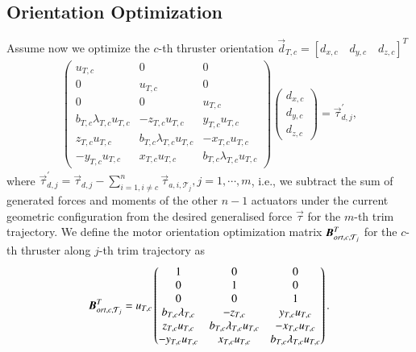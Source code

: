 \subsection{Orientation Optimization}
Assume now we optimize the $c$-th thruster orientation $\vec{d}_{T,c}=[d_{x,c} \quad d_{y,c} \quad d_{z,c}]^{T}$
\begin{align}
\begin{pmatrix}
u_{T,c}&0&0\\
0&u_{T,c}&0\\
0&0&u_{T,c}\\
b_{T,c}\lambda_{T,c}u_{T,c}&-z_{T,c}u_{T,c}&y_{T,c}u_{T,c}\\
z_{T,c}u_{T,c}&b_{T,c}\lambda_{T,c}u_{T,c}&-x_{T,c}u_{T,c}\\
-y_{T,c}u_{T,c}&x_{T,c}u_{T,c}&b_{T,c}\lambda_{T,c}u_{T,c}
\end{pmatrix}
\begin{pmatrix}
d_{x,c}\\d_{y,c}\\d_{z,c}
\end{pmatrix}
=\vec{\tau}^{'}_{d,j},
\end{align}
where $\vec{\tau}^{'}_{d,j}=\vec{\tau}_{d,j}-\sum_{i=1,i \neq c}^{n}\vec{\tau}_{a,i,\mathcal{T}_{j}}, j=1, \cdots, m$, i.e., we subtract the sum of generated forces and moments of the other $n-1$ actuators under the current geometric configuration  from the desired generalised force $\vec{\tau}$ for the $m$-th trim trajectory.
We define the motor orientation optimization matrix $\emph{\textbf{B}}_{ort,c,\mathcal{T}_{j}}^{T}$ for the $c$-th thruster along $j$-th trim trajectory as
\begin{align}
\emph{\textbf{B}}_{ort,c,\mathcal{T}_{j}}^{T}=
u_{T,c}\begin{pmatrix}
1&0&0\\
0&1&0\\
0&0&1\\
b_{T,c}\lambda_{T,c}&-z_{T,c}&y_{T,c}u_{T,c}\\
z_{T,c}u_{T,c}&b_{T,c}\lambda_{T,c}u_{T,c}&-x_{T,c}u_{T,c}\\
-y_{T,c}u_{T,c}&x_{T,c}u_{T,c}&b_{T,c}\lambda_{T,c}u_{T,c}
\end{pmatrix}.
\end{align}  
